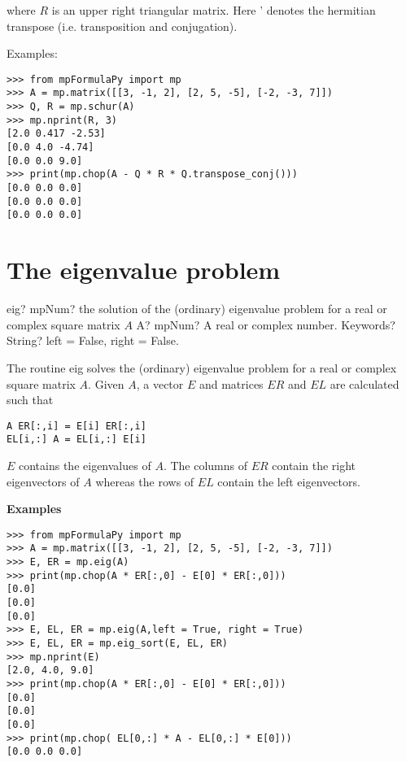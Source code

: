 where $R$ is an upper right triangular matrix. Here ' denotes the hermitian transpose (i.e. transposition and conjugation).

Examples:

\begin{lstlisting}
>>> from mpFormulaPy import mp
>>> A = mp.matrix([[3, -1, 2], [2, 5, -5], [-2, -3, 7]])
>>> Q, R = mp.schur(A)
>>> mp.nprint(R, 3)
[2.0 0.417 -2.53]
[0.0 4.0 -4.74]
[0.0 0.0 9.0]
>>> print(mp.chop(A - Q * R * Q.transpose_conj()))
[0.0 0.0 0.0]
[0.0 0.0 0.0]
[0.0 0.0 0.0]
\end{lstlisting}




\newpage
\section{The eigenvalue problem}


\begin{mpFunctionsExtract}
	\mpFunctionTwo
	{eig? mpNum? the solution of the (ordinary) eigenvalue problem for a real or complex square matrix $A$}
	{A? mpNum? A real or complex number.}
	{Keywords? String? left = False, right = False.}	
\end{mpFunctionsExtract}

\vpara
The routine eig solves the (ordinary) eigenvalue problem for a real or complex square matrix $A$. Given $A$, a vector $E$ and matrices $ER$ and $EL$ are calculated such that

\begin{lstlisting}
A ER[:,i] = E[i] ER[:,i]
EL[i,:] A = EL[i,:] E[i]
\end{lstlisting}

$E$ contains the eigenvalues of $A$. The columns of $ER$ contain the right eigenvectors of $A$ whereas the rows of $EL$ contain the left eigenvectors.

\vpara
\textbf{Examples}

\begin{lstlisting}
>>> from mpFormulaPy import mp
>>> A = mp.matrix([[3, -1, 2], [2, 5, -5], [-2, -3, 7]])
>>> E, ER = mp.eig(A)
>>> print(mp.chop(A * ER[:,0] - E[0] * ER[:,0]))
[0.0]
[0.0]
[0.0]
>>> E, EL, ER = mp.eig(A,left = True, right = True)
>>> E, EL, ER = mp.eig_sort(E, EL, ER)
>>> mp.nprint(E)
[2.0, 4.0, 9.0]
>>> print(mp.chop(A * ER[:,0] - E[0] * ER[:,0]))
[0.0]
[0.0]
[0.0]
>>> print(mp.chop( EL[0,:] * A - EL[0,:] * E[0]))
[0.0 0.0 0.0]
\end{lstlisting}


